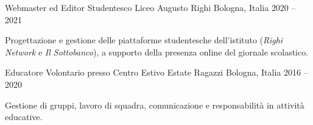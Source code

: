 \documentclass[11pt, a4paper]{../awesome-cv}
\begin{document}
\begin{cventries}
  \cventry
    {Webmaster ed Editor Studentesco}
    {Liceo Augusto Righi}
    {Bologna, Italia}
    {2020 -- 2021}
    {
      \begin{cvitems}
        \item {Progettazione e gestione delle piattaforme studentesche dell'istituto (\textit{Righi Network} e \textit{Il Sottobanco}), a supporto della presenza online del giornale scolastico.}
      \end{cvitems}
    }

  \cventry
    {Educatore Volontario presso Centro Estivo}
    {Estate Ragazzi}
    {Bologna, Italia}
    {2016 -- 2020}
    {
      \begin{cvitems}
        \item {Gestione di gruppi, lavoro di squadra, comunicazione e responsabilità in attività educative.}
      \end{cvitems}
    }
\end{cventries}
\end{document}
